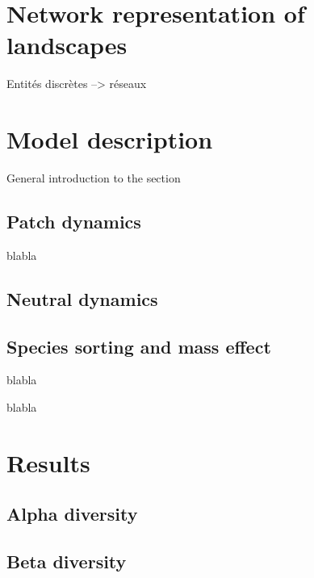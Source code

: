 \documentclass[letterpaper,twocolumn,showkeys]{revtex4-1}
\begin{document}
\section{Network representation of landscapes}

Entités discrètes --> réseaux

 


 

\section{Model description}

General introduction to the section

\subsection{Patch dynamics}
blabla

\subsection{Neutral dynamics}

\subsection{Species sorting and mass effect}
blabla

blabla

\section{Results}

\subsection{Alpha diversity}

\subsection{Beta diversity} 
\end{document}
